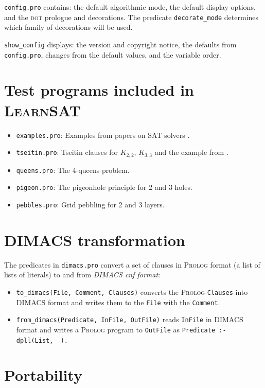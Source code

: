 \documentclass[11pt]{article}
\newcommand*{\p}[1]{\textup{\texttt{#1}}}
\newcommand*{\ls}{\textsc{LearnSAT}}
\newcommand*{\pl}{\textsc{Prolog}}
\newcommand*{\dt}{\textsc{dot}}
\begin{document}
\p{config.pro} contains: the default algorithmic mode, the default
display options, and the \dt{} prologue and decorations. The predicate
\p{decorate\_mode} determines which family of decorations will be used.

\p{show\_config} displays: the version and copyright notice, the
defaults from \p{config.pro}, changes from the default values, and the
variable order.


\section{Test programs included in \ls{}}

\begin{itemize}
\item \p{examples.pro}: Examples from papers on SAT
solvers \cite{mz,mlm,ms}.

\item \p{tseitin.pro}: Tseitin clauses for $K_{2,2}$,
$K_{3,3}$ and the example from \cite[Section 4.5]{mlcs}.

\item \p{queens.pro}: The 4-queens problem.

\item \p{pigeon.pro}: The pigeonhole principle for 2 and 3 holes.

\item \p{pebbles.pro}: Grid pebbling for 2 and 3 layers.
\end{itemize}

\section{DIMACS transformation}

The predicates in \p{dimacs.pro} convert a set of clauses in
\pl{} format (a list of lists of literals) to and from \emph{DIMACS cnf
format}:
\begin{itemize}
\item \p{to\_dimacs(File, Comment, Clauses)} converts the \pl{}
\p{Clauses} into DIMACS format and writes them to the \p{File} with the
\p{Comment}.
\item \p{from\_dimacs(Predicate, InFile, OutFile)} reads \p{InFile} in
DIMACS format and writes a \pl{} program to \p{OutFile} as
\verb+Predicate :- dpll(List, _).+
\end{itemize}

\section{Portability}\label{s.port}
\end{document}
